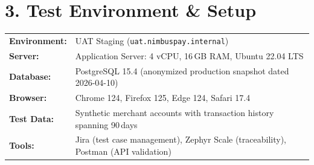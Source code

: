\section*{\color{primaryNavy}3. Test Environment \& Setup}
\sectionline

\begin{tabularx}{\textwidth}{@{}>{\bfseries}l X@{}}
  Environment: & UAT Staging (\texttt{uat.nimbuspay.internal}) \\
  Server:      & Application Server: 4 vCPU, 16\,GB RAM, Ubuntu 22.04 LTS \\
  Database:    & PostgreSQL 15.4 (anonymized production snapshot dated 2026-04-10) \\
  Browser:     & Chrome 124, Firefox 125, Edge 124, Safari 17.4 \\
  Test Data:   & Synthetic merchant accounts with transaction history spanning 90\,days \\
  Tools:       & Jira (test case management), Zephyr Scale (traceability), Postman (API validation) \\
\end{tabularx}

\vspace{12pt}
